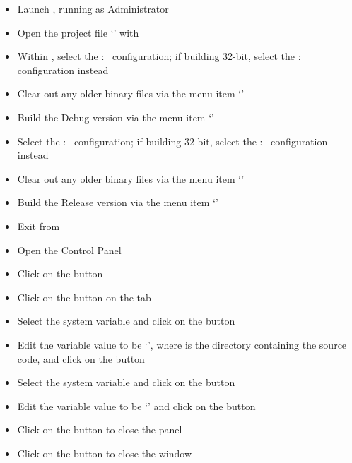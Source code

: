 \begin{itemize}
\item Launch , running as Administrator
\item\exSp{}Open the project file
`' with 
\item\exSp{}Within , select the  :\ 
configuration; if building 32-bit, select the  :\ 
configuration instead
\item\exSp{}Clear out any older binary files via the menu item
`'
\item\exSp{}Build the Debug version via the menu item
`'
\item\exSp{}Select the  :\  configuration; if building 32-bit,
select the  :\  configuration instead
\item\exSp{}Clear out any older binary files via the menu item
`'
\item\exSp{}Build the Release version via the menu item
`'
\item\exSp{}Exit from 
\item\exSp{}Open the  Control Panel
\item\exSp{}Click on the  button
\item\exSp{}Click on the  button on the 
tab
\item\exSp{}Select the  system variable and click on the
 button 
\item\exSp{}Edit the variable value to be
`', where 
is the directory containing the \mplusm{} source code, and click on the  button
\item\exSp{}Select the  system variable and click on
the  button 
\item\exSp{}Edit the variable value to be
`' and
click on the  button
\item\exSp{}Click on the  button to close the 
panel
\item\exSp{}Click on the  button to close the 
window
\end{itemize}
